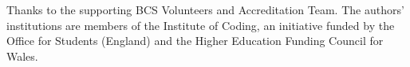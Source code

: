 \documentclass[sigconf]{acmart}
\begin{document}
\begin{acks}
Thanks to the supporting BCS Volunteers and Accreditation Team.  
The authors' institutions are members of the Institute of Coding, an initiative funded by the Office for Students (England) and the Higher Education Funding Council for Wales.	
\end{acks}

%

\appendix
\end{document}
